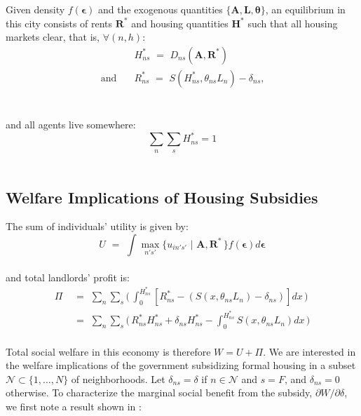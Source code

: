 \documentclass[12pt]{article}
\begin{document}
Given density $f(\bm{\epsilon})$ and the exogenous quantities $\{\bm{A},\bm{L},\bm{\theta}\}$, an equilibrium in this city consists of rents $\bm{R}^*$ and housing quantities $\bm{H}^*$ such that all housing markets clear, that is, $\forall (n,h)$:
\begin{equation}
\begin{aligned}
& H^*_{ns} \,\, =\,\, D_{ns}(\bm{A}, \bm{R}^*) \\
\text{and}\quad & R^*_{ns} \,\, =\,\, S(H^*_{ns},\theta_{ns}L_n) - \delta_{ns} \text{,}
\end{aligned}
\end{equation}\\[-1.99em]\\[-1.99em]
 and all agents live somewhere:
\begin{equation*}
\sum_{n}\sum_{s} H^*_{ns} = 1 
\end{equation*} \\[-1.99em]

\subsection*{Welfare Implications of Housing Subsidies}

 The sum of individuals' utility is given by:
\begin{equation*}
U \,\, =\,\, \int \max_{n's'}\{u_{in' s'}\,\,|\,\, \bm{A},\bm{R}^*\,\}f(\bm{\epsilon}) d\bm{\epsilon} 
\end{equation*} \\[-1.99em]
 and total landlords' profit is:
\begin{equation*}
\begin{aligned}
\Pi \,\, &=\,\, \sum_{n}\sum_{s} \Bigg(\,\int_0^{H^*_{ns}} [R^*_{ns} - (S(x,\theta_{ns}L_n) - \delta_{ns})]dx \, \Bigg) \\[.6em]
\,\, &=\,\, \sum_{n}\sum_{s} \Bigg(\, R^*_{ns}H^*_{ns} +  \delta_{ns}H^*_{ns} -  \int_0^{H^*_{ns}}S(x,\theta_{ns}L_n)dx  \,\Bigg)
\end{aligned}
\end{equation*} \\[-1.99em]
 Total social welfare in this economy is therefore $W = U + \Pi$. We are interested in the welfare implications of the government subsidizing formal housing in a subset $\mathcal{N}\subset\{1,...,N\}$ of neighborhoods. Let $\delta_{ns}=\delta$ if $n\in\mathcal{N}$ and $s=F$, and $\delta_{ns}=0$ otherwise.  To characterize the marginal social benefit from the subsidy, $\partial W/\partial \delta$,  we first note a result shown in \cite{busso2013assessing}:
\end{document}
